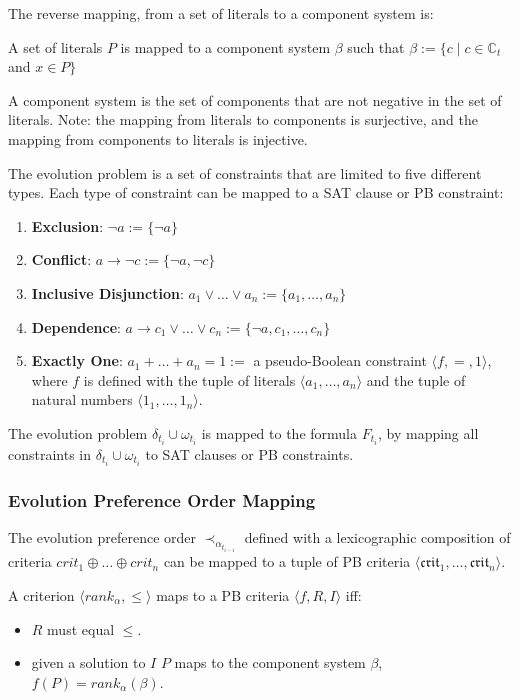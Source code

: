 The reverse mapping, from a set of literals to a component system is:
\begin{defs}
A set of literals $P$ is mapped to a component system $\beta$ such that $\beta := \{c \mid c \in \mathbb{C}_t$ and $x \in P\}$
\end{defs}
A component system is the set of components that are not negative in the set of literals.  
Note: the mapping from literals to components is surjective, and the mapping from components to literals is injective.

The evolution problem is a set of constraints that are limited to five different types.
Each type of constraint can be mapped to a SAT clause or PB constraint:
\begin{enumerate}
  \item \textbf{Exclusion}: $\neg a := \{\neg a\}$
  \item \textbf{Conflict}: $a \rightarrow \neg c := \{\neg a, \neg c\}$ 
  \item \textbf{Inclusive Disjunction}: $a_1 \vee \ldots \vee a_n := \{a_1, \ldots,  a_n\}$ 
  \item \textbf{Dependence}: $a \rightarrow c_1 \vee \ldots \vee c_n := \{\neg a, c_1, \ldots, c_n\}$
  \item \textbf{Exactly One}: $a_1 + \ldots + a_n = 1 := $ a pseudo-Boolean constraint $\langle f,=, 1 \rangle$, 
  where $f$ is defined with the tuple of literals $\langle a_1 ,\ldots , a_n\rangle$ and the tuple of natural numbers $\langle 1_1,\ldots,1_n \rangle$.
\end{enumerate}

\begin{defs}
The evolution problem $\delta_{t_i} \cup \omega_{t_i}$ is mapped to the formula $F_{t_i}$, by mapping all constraints in $\delta_{t_i} \cup \omega_{t_i}$ to SAT clauses or PB constraints.
\end{defs}

\subsubsection{Evolution Preference Order Mapping}
The evolution preference order $\prec_{\alpha_{t_{i-1}}}$ defined with a lexicographic composition of criteria $crit_{1} \oplus \ldots \oplus crit_{n}$ 
can be mapped to a tuple of PB criteria $\langle \mathfrak{crit}_1,\ldots,\mathfrak{crit}_n\rangle$.

A criterion $\langle rank_{\alpha} ,\leq \rangle$ maps to a PB criteria $\langle f, R , I \rangle$ iff:
\begin{itemize}
  \item $R$ must equal $\leq$.
  \item given a solution to $I$ $P$ maps to the component system $\beta$, $f(P) = rank_{\alpha}(\beta)$. 
\end{itemize} 

